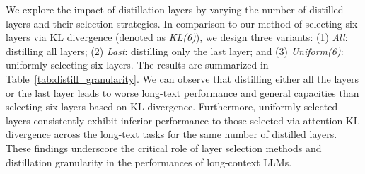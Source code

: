 


We explore the impact of distillation layers by varying the number of distilled layers and their selection strategies. In comparison to our method of selecting six layers via KL divergence (denoted as \emph{KL(6)}), we design three variants: (1) \emph{All}: distilling all layers; (2) \emph{Last}: distilling only the last layer; and (3) \emph{Uniform(6)}: uniformly selecting six layers. The results are summarized in Table~\ref{tab:distill_granularity}.
We can observe that distilling either all the layers or the last layer leads to worse long-text performance and general capacities than selecting six layers based on KL divergence. Furthermore, uniformly selected layers consistently exhibit inferior performance to those selected via attention KL divergence across the long-text tasks for the same number of distilled layers. These findings underscore the critical role of layer selection methods and distillation granularity in the performances of long-context LLMs.

